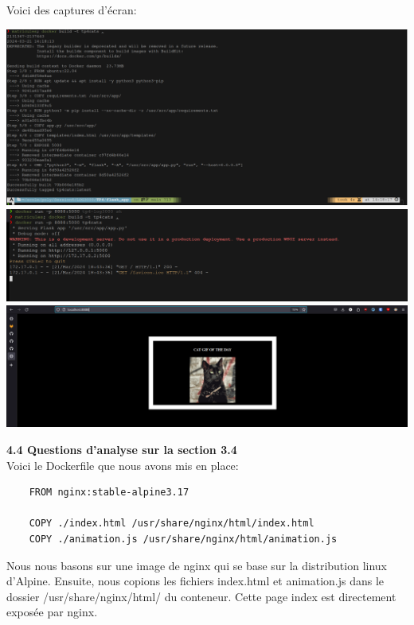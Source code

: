 \documentclass[12pt, letterpaper]{report}
\begin{document}
Voici des captures d'écran: \\
\begin{center}
	\includegraphics[scale=0.25]{4.1-build.png} \\
	\includegraphics[scale=0.25]{4.1-run.png} \\
	\includegraphics[scale=0.25]{4.1-app.png} \\
\end{center}

\textbf{4.4 Questions d'analyse sur la section 3.4}\\
Voici le Dockerfile que nous avons mis en place: \\
\begin{verbatim}
	FROM nginx:stable-alpine3.17
	
	COPY ./index.html /usr/share/nginx/html/index.html
	COPY ./animation.js /usr/share/nginx/html/animation.js  
\end{verbatim}
Nous nous basons sur une image de nginx qui se base sur la distribution linux d'Alpine. 
Ensuite, nous copions les fichiers index.html et animation.js dans le dossier /usr/share/nginx/html/ du conteneur. Cette page index est directement exposée par nginx.
\end{document}
